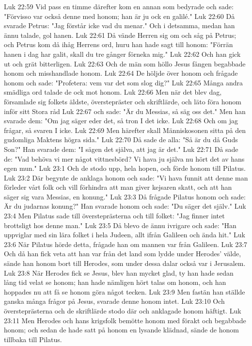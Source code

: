 Luk 22:59  Vid pass en timme därefter kom en annan som bedyrade och sade: "Förvisso var också denne med honom; han är ju ock en galilé."
Luk 22:60  Då svarade Petrus: "Jag förstår icke vad du menar." Och i detsamma, medan han ännu talade, gol hanen.
Luk 22:61  Då vände Herren sig om och såg på Petrus; och Petrus kom då ihåg Herrens ord, huru han hade sagt till honom: "Förrän hanen i dag har galit, skall du tre gånger förneka mig."
Luk 22:62  Och han gick ut och grät bitterligen.
Luk 22:63  Och de män som höllo Jesus fången begabbade honom och misshandlade honom.
Luk 22:64  De höljde över honom och frågade honom och sade: "Profetera: vem var det som slog dig?"
Luk 22:65  Många andra smädliga ord talade de ock mot honom.
Luk 22:66  Men när det blev dag, församlade sig folkets äldste, överstepräster och skriftlärde, och läto föra honom inför sitt Stora råd
Luk 22:67  och sade: "Är du Messias, så säg oss det." Men han svarade dem: "Om jag säger eder det, så tron I det icke.
Luk 22:68  Och om jag frågar, så svaren I icke.
Luk 22:69  Men härefter skall Människosonen sitta på den gudomliga Maktens högra sida."
Luk 22:70  Då sade de alla: "Så är du då Guds Son?" Han svarade dem: "I sägen det själva, att jag är det."
Luk 22:71  Då sade de: "Vad behöva vi mer något vittnesbörd? Vi hava ju själva nu hört det av hans egen mun."
Luk 23:1  Och de stodo upp, hela hopen, och förde honom till Pilatus.
Luk 23:2  Där begynte de anklaga honom och sade: "Vi hava funnit att denne man förleder vårt folk och vill förhindra att man giver kejsaren skatt, och att han säger sig vara Messias, en konung."
Luk 23:3  Då frågade Pilatus honom och sade: Är du judarnas konung?" Han svarade honom och sade: "Du säger det själv."
Luk 23:4  Men Pilatus sade till översteprästerna och till folket: "Jag finner intet brottsligt hos denne man."
Luk 23:5  Då blevo de ännu ivrigare och sade: "Han uppviglar med sin lära folket i hela Judeen, allt ifrån Galileen och ända hit."
Luk 23:6  När Pilatus hörde detta, frågade han om mannen var från Galileen.
Luk 23:7  Och då han fick veta att han var från det land som lydde under Herodes' välde, sände han honom bort till Herodes, som under dessa dalar också var i Jerusalem.
Luk 23:8  När Herodes fick se Jesus, blev han mycket glad, ty han hade sedan lång tid velat se honom; han hade nämligen hört talas om honom, och han hoppades nu att få se honom göra något tecken.
Luk 23:9  Men fastän han ställde ganska många frågor på Jesus, svarade denne honom intet.
Luk 23:10  Och översteprästerna och de skriftlärde stodo där och anklagade honom häftigt.
Luk 23:11  Men Herodes och hans krigsfolk bemötte honom med förakt och begabbade honom; och sedan de hade satt på honom en lysande klädnad, sände de honom tillbaka till Pilatus.
